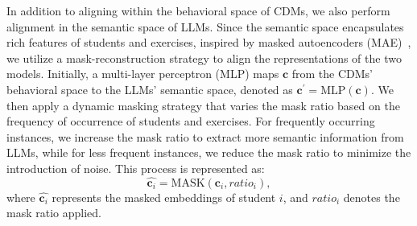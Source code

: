 In addition to aligning within the behavioral space of CDMs, we also perform alignment in the semantic space of LLMs. Since the semantic space encapsulates rich features of students and exercises, inspired by masked autoencoders (MAE)~\cite{he2022masked}, we utilize a mask-reconstruction strategy to align the representations of the two models. 
Initially, a multi-layer perceptron (MLP) maps $\mathbf{c}$ from the CDMs' behavioral space to the LLMs' semantic space, denoted as $\mathbf{c}^\prime=\mathrm{MLP}(\mathbf{c})$. We then apply a dynamic masking strategy that varies the mask ratio based on the frequency of occurrence of students and exercises. For frequently occurring instances, we increase the mask ratio to extract more semantic information from LLMs, while for less frequent instances, we reduce the mask ratio to minimize the introduction of noise. This process is represented as:
\begin{equation}
    \widehat{\mathbf{c}_i} =\mathrm{MASK}(\mathbf{c}_i, ratio_i),
\end{equation}
where $\widehat{\mathbf{c}_i}$ represents the masked embeddings of student $i$, and $ratio_i$ denotes the mask ratio applied.


